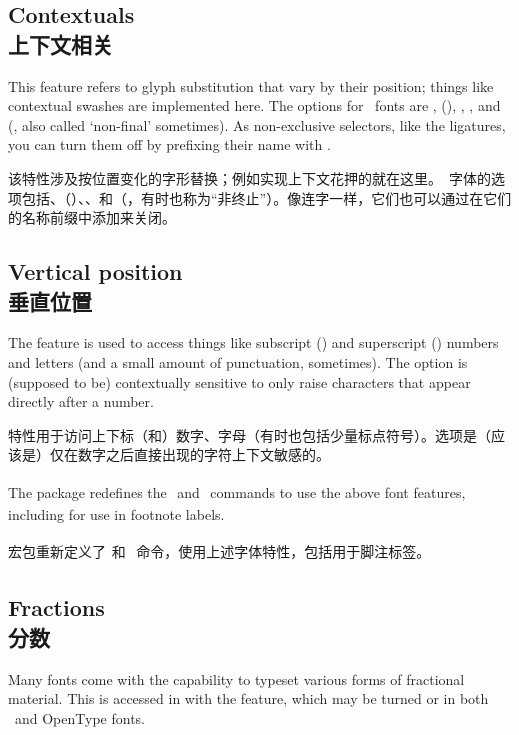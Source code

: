 \documentclass[a4paper]{l3doc}
\begin{document}
\subsection{Contextuals\\上下文相关} \label{sec:contextuals}
This feature refers to glyph substitution that vary by their position;
things like contextual swashes are implemented here.
The options for \AAT\ fonts are
,  (), ,
, and  (, also called `non-final' sometimes). As
non-exclusive selectors, like the ligatures, you can turn them off
by prefixing their name with .

该特性涉及按位置变化的字形替换；例如实现上下文花押的就在这里。\AAT\ 字体的选项包括、（）、、和（，有时也称为“非终止”）。像连字一样，它们也可以通过在它们的名称前缀中添加来关闭。

\subsection{Vertical position\\垂直位置}
The  feature is used to access things like
subscript () and superscript () numbers and
letters (and a small amount of punctuation, sometimes).
The  option is (supposed to be)
contextually sensitive to only raise characters that appear directly
after a number.

特性用于访问上下标（和）数字、字母（有时也包括少量标点符号）。选项是（应该是）仅在数字之后直接出现的字符上下文敏感的。

The  package redefines the \cmd\textsubscript\ and
\cmd\textsuperscript\ commands to use the above font features,
including for use in footnote labels.

宏包重新定义了\cmd\textsubscript\ 和 \cmd\textsuperscript\ 命令，使用上述字体特性，包括用于脚注标签。

\subsection{Fractions\\分数}
Many fonts come with the capability to typeset various forms of
fractional material. This is accessed in  with the
 feature, which may be turned  or 
in both \AAT\ and OpenType fonts.
\end{document}
